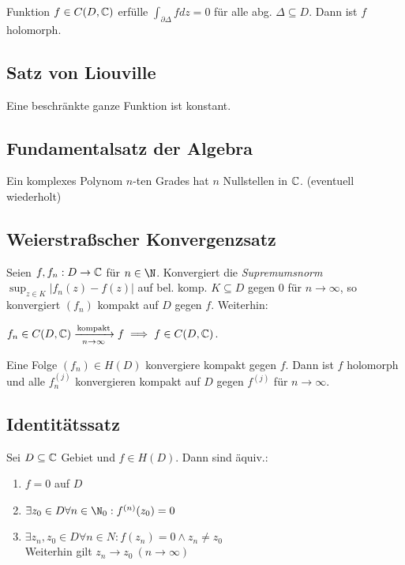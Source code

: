 Funktion $f \in C(D,\mathbb{C})$ erfülle $\int_{\partial\Delta} f dz = 0$ für alle abg. $\Delta \subseteq D$. Dann ist $f$ holomorph.

\subsection*{Satz von Liouville}

Eine beschränkte ganze Funktion ist konstant.

\subsection*{Fundamentalsatz der Algebra}

Ein komplexes Polynom $n$-ten Grades hat $n$ Nullstellen in $\mathbb{C}$. (eventuell wiederholt)

\subsection*{Weierstraßscher Konvergenzsatz}

Seien $f, f_n : D \to \mathbb{C}$ für $n \in \N$. Konvergiert die \emph{Supremumsnorm} $\sup_{z \in K} |f_n(z)-f(z)|$ auf bel. komp. $K \subseteq D$ gegen $0$ für $n \to \infty$, so konvergiert $(f_n)$ kompakt auf $D$ gegen $f$. Weiterhin:

\spacing

$f_n \in C(D,\mathbb{C}) \xrightarrow[n \to \infty]{\text{kompakt}} f \implies f \in C(D,\mathbb{C})$.

\spacing

Eine Folge $(f_n) \in H(D)$ konvergiere kompakt gegen $f$. Dann ist $f$ holomorph und alle $f_n^{(j)}$ konvergieren kompakt auf $D$ gegen $f^{(j)}$ für $n \to \infty$.

\subsection*{Identitätssatz}

Sei $D \subseteq \mathbb{C}$ Gebiet und $f \in H(D)$. Dann sind äquiv.:

\begin{enumerate}[label=(\alph*)]
	\item $f = 0$ auf $D$
	\item $\exists z_0 \in D \forall n \in \N_0 : f^{(n)}(z_0) = 0$
	\item $\exists z_n, z_0 \in D \forall n \in N : f(z_n) = 0 \land z_n \neq z_0$ \\ Weiterhin gilt $z_n \to z_0 \ (n \to \infty)$
\end{enumerate}

